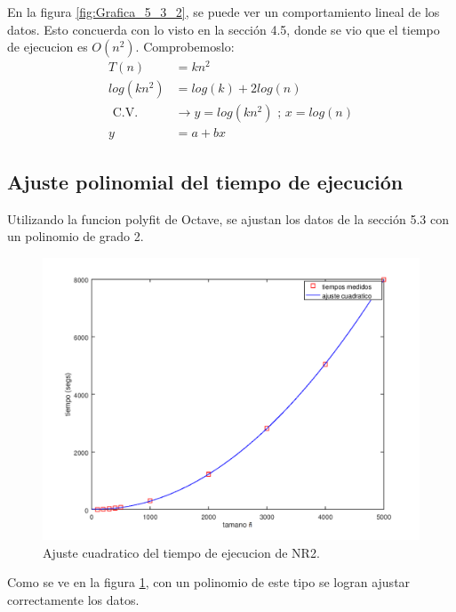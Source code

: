 \documentclass{endm}
\begin{document}
En la figura \ref{fig:Grafica_5_3_2}, se puede ver un comportamiento lineal de los datos.
Esto concuerda con lo visto en la sección 4.5, donde se vio que el tiempo de ejecucion es $O(n^2)$.
Comprobemoslo:
\begin{align}
    T(n) &= kn^2 \\
    log(kn^2) &= log(k) + 2log(n) \\
    \text{ C.V.}& \rightarrow y = log(kn^2) \text{ ; } x = log(n) \\
    y &= a + bx
\end{align}

\subsection{Ajuste polinomial del tiempo de ejecución}
Utilizando la funcion polyfit de Octave, se ajustan los datos de la sección 5.3 con un polinomio de grado 2.
\begin{figure}[h!]
    \includegraphics[width=\linewidth]{Grafica_5_4.png}
    \caption{Ajuste cuadratico del tiempo de ejecucion de NR2.}
    \label{fig:Grafica_5_4}
\end{figure}
Como se ve en la figura \ref{fig:Grafica_5_4}, con un polinomio de este tipo se logran ajustar correctamente los datos.
\clearpage
\printbibliography
%
%
\end{document}
